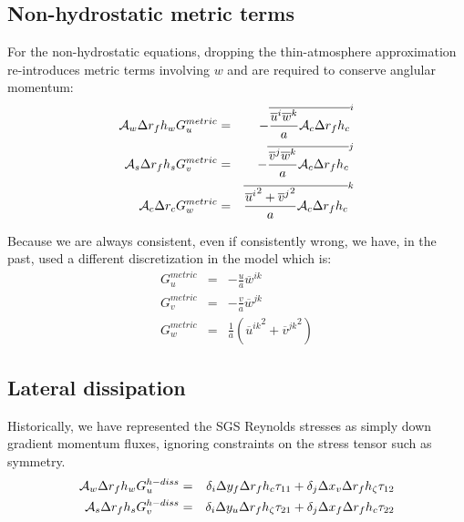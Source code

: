 \subsection{Non-hydrostatic metric terms}

For the non-hydrostatic equations, dropping the thin-atmosphere
approximation re-introduces metric terms involving $w$ and are
required to conserve anglular momentum:
\begin{eqnarray}
{\cal A}_w \Delta r_f h_w G_u^{metric} & = &
- \overline{ \frac{ \overline{u}^i \overline{w}^k }{a} {\cal A}_c \Delta r_f h_c }^i \\
{\cal A}_s \Delta r_f h_s G_v^{metric} & = &
- \overline{ \frac{ \overline{v}^j \overline{w}^k }{a} {\cal A}_c \Delta r_f h_c}^j \\
{\cal A}_c \Delta r_c G_w^{metric} & = &
  \overline{ \frac{ {\overline{u}^i}^2 + {\overline{v}^j}^2}{a} {\cal A}_c \Delta r_f h_c }^k
\end{eqnarray}

Because we are always consistent, even if consistently wrong, we have,
in the past, used a different discretization in the model which is:
\begin{eqnarray}
G_u^{metric} & = &
- \frac{u}{a} \overline{w}^{ik} \\
G_v^{metric} & = &
- \frac{v}{a} \overline{w}^{jk} \\
G_w^{metric} & = &
  \frac{1}{a} ( {\overline{u}^{ik}}^2 + {\overline{v}^{jk}}^2 )
\end{eqnarray}



\subsection{Lateral dissipation}

Historically, we have represented the SGS Reynolds stresses as simply
down gradient momentum fluxes, ignoring constraints on the stress
tensor such as symmetry.
\begin{eqnarray}
{\cal A}_w \Delta r_f h_w G_u^{h-diss} & = &
  \delta_i  \Delta y_f \Delta r_f h_c \tau_{11}
+ \delta_j  \Delta x_v \Delta r_f h_\zeta \tau_{12} \\
{\cal A}_s \Delta r_f h_s G_v^{h-diss} & = &
  \delta_i  \Delta y_u \Delta r_f h_\zeta \tau_{21}
+ \delta_j  \Delta x_f \Delta r_f h_c \tau_{22}
\end{eqnarray}

